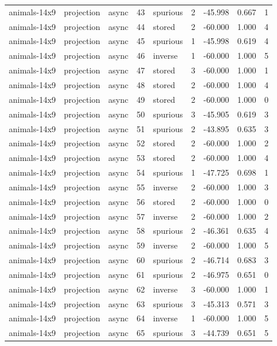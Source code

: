 \begin{tabular}{lllrlrrrr}
animals-14x9 & projection & async & 43 & spurious & 2 & -45.998 & 0.667 & 1 \\
animals-14x9 & projection & async & 44 & stored & 2 & -60.000 & 1.000 & 4 \\
animals-14x9 & projection & async & 45 & spurious & 1 & -45.998 & 0.619 & 4 \\
animals-14x9 & projection & async & 46 & inverse & 1 & -60.000 & 1.000 & 5 \\
animals-14x9 & projection & async & 47 & stored & 3 & -60.000 & 1.000 & 1 \\
animals-14x9 & projection & async & 48 & stored & 2 & -60.000 & 1.000 & 4 \\
animals-14x9 & projection & async & 49 & stored & 2 & -60.000 & 1.000 & 0 \\
animals-14x9 & projection & async & 50 & spurious & 3 & -45.905 & 0.619 & 3 \\
animals-14x9 & projection & async & 51 & spurious & 2 & -43.895 & 0.635 & 3 \\
animals-14x9 & projection & async & 52 & stored & 2 & -60.000 & 1.000 & 2 \\
animals-14x9 & projection & async & 53 & stored & 2 & -60.000 & 1.000 & 4 \\
animals-14x9 & projection & async & 54 & spurious & 1 & -47.725 & 0.698 & 1 \\
animals-14x9 & projection & async & 55 & inverse & 2 & -60.000 & 1.000 & 3 \\
animals-14x9 & projection & async & 56 & stored & 2 & -60.000 & 1.000 & 0 \\
animals-14x9 & projection & async & 57 & inverse & 2 & -60.000 & 1.000 & 2 \\
animals-14x9 & projection & async & 58 & spurious & 2 & -46.361 & 0.635 & 4 \\
animals-14x9 & projection & async & 59 & inverse & 2 & -60.000 & 1.000 & 5 \\
animals-14x9 & projection & async & 60 & spurious & 2 & -46.714 & 0.683 & 3 \\
animals-14x9 & projection & async & 61 & spurious & 2 & -46.975 & 0.651 & 0 \\
animals-14x9 & projection & async & 62 & inverse & 3 & -60.000 & 1.000 & 1 \\
animals-14x9 & projection & async & 63 & spurious & 3 & -45.313 & 0.571 & 3 \\
animals-14x9 & projection & async & 64 & inverse & 1 & -60.000 & 1.000 & 5 \\
animals-14x9 & projection & async & 65 & spurious & 3 & -44.739 & 0.651 & 5 \\

\end{tabular}
